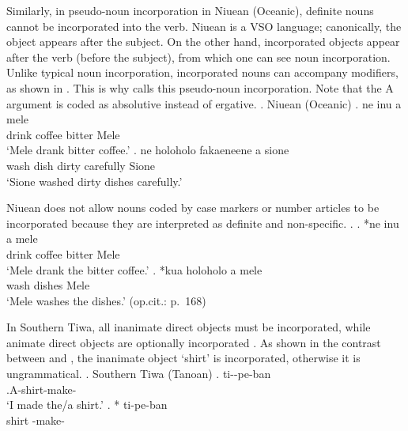 Similarly, in pseudo-noun incorporation in Niuean (Oceanic),
definite nouns cannot be incorporated into the verb.
Niuean is a VSO language;
canonically, the object appears after the subject.
On the other hand,
incorporated objects appear after the verb (before the subject),
from which one can see noun incorporation.
Unlike typical noun incorporation,
incorporated nouns can accompany modifiers,
as shown in \Next.
This is why  calls this pseudo-noun incorporation.
Note that the A argument  is coded as absolutive instead of ergative.
%
\ex. Niuean (Oceanic)
 \ag. ne inu   a mele \\
       drink coffee bitter  Mele \\
      `Mele drank bitter coffee.'
 \bg. ne holoholo   fakaeneene a sione \\
       wash dish dirty carefully  Sione \\
      `Sione washed dirty dishes carefully.'
  \hfill{\cite[158]{massam01}}

Niuean does not allow nouns coded by case markers or number articles
to be incorporated
because they are interpreted as definite and non-specific.
%
\ex.
 \ag. *ne inu    a mele \\
       drink  coffee bitter  Mele \\
      `Mele drank the bitter coffee.'
 \bg. *kua holoholo   a mele \\
        wash  dishes  Mele \\
       `Mele washes the dishes.'
 \hfill{(op.cit.: p.~168)}

In Southern Tiwa,
all inanimate direct objects must be incorporated,
while animate direct objects are optionally incorporated \cite{allenetal84}.
As shown in the contrast between \Next[a] and \Next[b],
the inanimate object  `shirt' is incorporated,
otherwise it is ungrammatical.
%
\ex. Southern Tiwa (Tanoan)
 \ag. ti--pe-ban \\
      .{\sc A}-shirt-make-\\
      `I made the/a shirt.'
 \bg. * ti-pe-ban \\
      shirt -make-\\
      \hfill{\cite[293]{allenetal84}}

